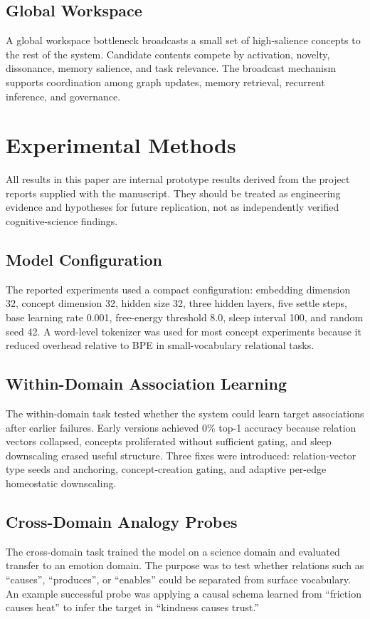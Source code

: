 \documentclass[11pt]{article}
\begin{document}
\subsection{Global Workspace}
A global workspace bottleneck broadcasts a small set of high-salience concepts to the rest of the system. Candidate contents compete by activation, novelty, dissonance, memory salience, and task relevance. The broadcast mechanism supports coordination among graph updates, memory retrieval, recurrent inference, and governance.

\section{Experimental Methods}
All results in this paper are internal prototype results derived from the project reports supplied with the manuscript. They should be treated as engineering evidence and hypotheses for future replication, not as independently verified cognitive-science findings.

\subsection{Model Configuration}
The reported experiments used a compact configuration: embedding dimension 32, concept dimension 32, hidden size 32, three hidden layers, five settle steps, base learning rate 0.001, free-energy threshold 8.0, sleep interval 100, and random seed 42. A word-level tokenizer was used for most concept experiments because it reduced overhead relative to BPE in small-vocabulary relational tasks.

\subsection{Within-Domain Association Learning}
The within-domain task tested whether the system could learn target associations after earlier failures. Early versions achieved 0\% top-1 accuracy because relation vectors collapsed, concepts proliferated without sufficient gating, and sleep downscaling erased useful structure. Three fixes were introduced: relation-vector type seeds and anchoring, concept-creation gating, and adaptive per-edge homeostatic downscaling.

\subsection{Cross-Domain Analogy Probes}
The cross-domain task trained the model on a science domain and evaluated transfer to an emotion domain. The purpose was to test whether relations such as ``causes'', ``produces'', or ``enables'' could be separated from surface vocabulary. An example successful probe was applying a causal schema learned from ``friction causes heat'' to infer the target in ``kindness causes trust.''
\end{document}
